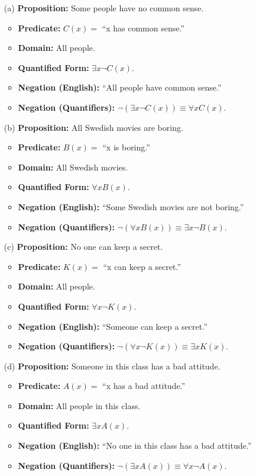 \documentclass[12pt]{article}
\begin{document}
\begin{itemize}
    \item[(a)] {\bf Proposition:} Some people have no common sense.
    \begin{itemize}
        \item {\bf Predicate:} \(C(x) = \) ``x has common sense.''
        \item {\bf Domain:} All people.
        \item {\bf Quantified Form:} \(\exists x \neg C(x)\).
        \item {\bf Negation (English):} ``All people have common sense.''
        \item {\bf Negation (Quantifiers):} \(\neg (\exists x \neg C(x)) \equiv \forall x C(x)\).
    \end{itemize}

    \item[(b)] {\bf Proposition:} All Swedish movies are boring.
    \begin{itemize}
        \item {\bf Predicate:} \(B(x) = \) ``x is boring.''
        \item {\bf Domain:} All Swedish movies.
        \item {\bf Quantified Form:} \(\forall x B(x)\).
        \item {\bf Negation (English):} ``Some Swedish movies are not boring.''
        \item {\bf Negation (Quantifiers):} \(\neg (\forall x B(x)) \equiv \exists x \neg B(x)\).
    \end{itemize}

    \item[(c)] {\bf Proposition:} No one can keep a secret.
    \begin{itemize}
        \item {\bf Predicate:} \(K(x) = \) ``x can keep a secret.''
        \item {\bf Domain:} All people.
        \item {\bf Quantified Form:} \(\forall x \neg K(x)\).
        \item {\bf Negation (English):} ``Someone can keep a secret.''
        \item {\bf Negation (Quantifiers):} \(\neg (\forall x \neg K(x)) \equiv \exists x K(x)\).
    \end{itemize}

    \item[(d)] {\bf Proposition:} Someone in this class has a bad attitude.
    \begin{itemize}
        \item {\bf Predicate:} \(A(x) = \) ``x has a bad attitude.''
        \item {\bf Domain:} All people in this class.
        \item {\bf Quantified Form:} \(\exists x A(x)\).
        \item {\bf Negation (English):} ``No one in this class has a bad attitude.''
        \item {\bf Negation (Quantifiers):} \(\neg (\exists x A(x)) \equiv \forall x \neg A(x)\).
    \end{itemize}
\end{itemize}
\end{document}
